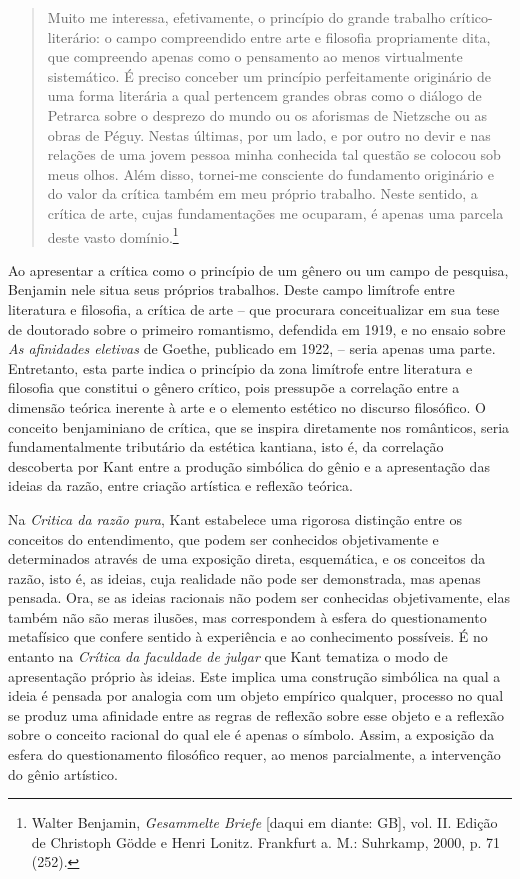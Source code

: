 \begin{quote}
Muito me interessa, efetivamente, o princípio do grande trabalho
crítico-literário: o campo compreendido entre arte e filosofia
propriamente dita, que compreendo apenas como o pensamento ao menos
virtualmente sistemático. É preciso conceber um princípio perfeitamente
originário de uma forma literária a qual pertencem grandes obras como o
diálogo de Petrarca sobre o desprezo do mundo ou os aforismas de
Nietzsche ou as obras de Péguy. Nestas últimas, por um lado, e por outro
no devir e nas relações de uma jovem pessoa minha conhecida tal questão
se colocou sob meus olhos. Além disso, tornei-me consciente do
fundamento originário e do valor da crítica também em meu próprio
trabalho. Neste sentido, a crítica de arte, cujas fundamentações me
ocuparam, é apenas uma parcela deste vasto domínio.\footnote{Walter
  Benjamin, \emph{Gesammelte Briefe} [daqui em diante: GB], vol. II.
  Edição de Christoph Gödde e Henri Lonitz. Frankfurt a. M.: Suhrkamp,
  2000, p. 71 (252).}
\end{quote}

Ao apresentar a crítica como o princípio de um gênero ou um campo de
pesquisa, Benjamin nele situa seus próprios trabalhos. Deste campo
limítrofe entre literatura e filosofia, a crítica de arte -- que
procurara conceitualizar em sua tese de doutorado sobre o primeiro
romantismo, defendida em 1919, e no ensaio sobre \emph{As afinidades
eletivas} de Goethe, publicado em 1922, -- seria apenas uma parte.
Entretanto, esta parte indica o princípio da zona limítrofe entre
literatura e filosofia que constitui o gênero crítico, pois pressupõe a
correlação entre a dimensão teórica inerente à arte e o elemento
estético no discurso filosófico. O conceito benjaminiano de crítica, que
se inspira diretamente nos românticos, seria fundamentalmente tributário
da estética kantiana, isto é, da correlação descoberta por Kant entre a
produção simbólica do gênio e a apresentação das ideias da razão, entre
criação artística e reflexão teórica.

Na \emph{Critica da razão pura}, Kant estabelece uma rigorosa distinção
entre os conceitos do entendimento, que podem ser conhecidos
objetivamente e determinados através de uma exposição direta,
esquemática, e os conceitos da razão, isto é, as ideias, cuja realidade
não pode ser demonstrada, mas apenas pensada. Ora, se as ideias
racionais não podem ser conhecidas objetivamente, elas também não são
meras ilusões, mas correspondem à esfera do questionamento metafísico
que confere sentido à experiência e ao conhecimento possíveis. É no
entanto na \emph{Crítica da faculdade de julgar} que Kant tematiza o
modo de apresentação próprio às ideias. Este implica uma construção
simbólica na qual a ideia é pensada por analogia com um objeto empírico
qualquer, processo no qual se produz uma afinidade entre as regras de
reflexão sobre esse objeto e a reflexão sobre o conceito racional do
qual ele é apenas o símbolo. Assim, a exposição da esfera do
questionamento filosófico requer, ao menos parcialmente, a intervenção
do gênio artístico.

